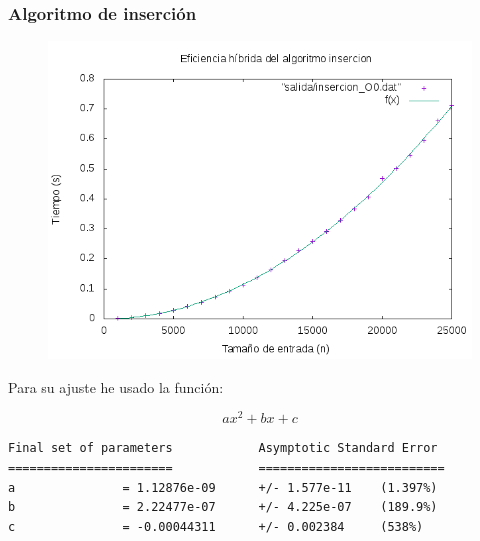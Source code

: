 \documentclass[spanish]{beamer}
\begin{document}
%
%

\begin{frame}\frametitle{Algoritmo de inserción}
  \begin{figure}[H]
    \centering   
        \includegraphics[clip,width=1\columnwidth]{../plots/insercion_O0_fit.png}%
    \end{figure}
\end{frame}

\begin{frame}[fragile]
  Para su ajuste he usado la función:

  $$ax^2+bx+c$$
  
\scriptsize
\begin{verbatim}
Final set of parameters            Asymptotic Standard Error
=======================            ==========================
a               = 1.12876e-09      +/- 1.577e-11    (1.397%)
b               = 2.22477e-07      +/- 4.225e-07    (189.9%)
c               = -0.00044311      +/- 0.002384     (538%)
\end{verbatim}

\end{frame}


%
%
\end{document}
